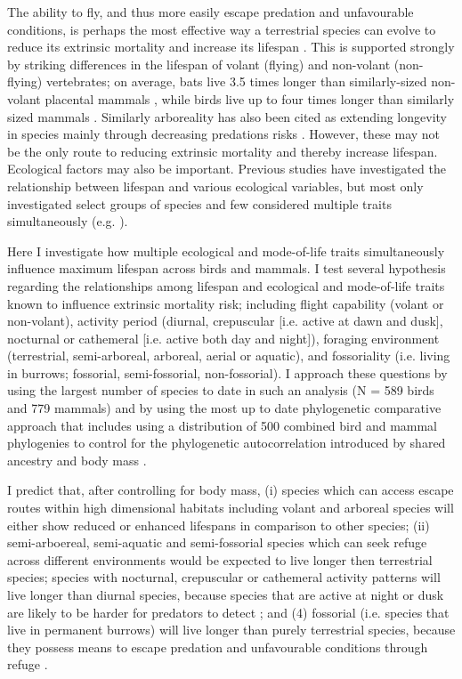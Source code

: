 The ability to fly, and thus more easily escape predation and unfavourable conditions, is perhaps the most effective way a terrestrial species can evolve to reduce its extrinsic mortality and increase its lifespan \citep{partridge1993optimality,holmes1994fly,pomeroy1990fly}. This is supported strongly by striking differences in the lifespan of volant (flying) and non-volant (non-flying) vertebrates; on average, bats live 3.5 times longer than similarly-sized non-volant placental mammals \citep{wilkinson2002life,austad1991mammalian}, while birds live up to four times longer than similarly sized mammals \citep{lindstedt1981body,holmes2003birds}. Similarly arboreality has also been cited as extending longevity in species mainly through decreasing predations risks \citep{shattuck2010arboreality}. However, these may not be the only route to reducing extrinsic mortality and thereby increase lifespan. Ecological factors may also be important. Previous studies have investigated the relationship between lifespan and various ecological variables, but most only investigated select groups of species and few considered multiple traits simultaneously (e.g. \cite{shattuck2010arboreality}).

Here I investigate how multiple ecological and mode-of-life traits simultaneously influence maximum lifespan across birds and mammals. I test several hypothesis regarding the relationships among lifespan and ecological and mode-of-life traits known to influence extrinsic mortality risk; including flight capability (volant or non-volant), activity period (diurnal, crepuscular [i.e. active at dawn and dusk], nocturnal or cathemeral [i.e. active both day and night]), foraging environment (terrestrial, semi-arboreal, arboreal, aerial or aquatic), and fossoriality (i.e. living in burrows; fossorial, semi-fossorial, non-fossorial). I approach these questions by using the largest number of species to date in such an analysis (N =  589 birds and 779 mammals) and by using the most up to date phylogenetic comparative approach that includes using a distribution of 500 combined bird and mammal phylogenies to control for the phylogenetic autocorrelation introduced by shared ancestry \citep{harvey1991comparative} and body mass \citep{lindstedt1981body}.


I predict that, after controlling for body mass, (i) species which can access escape routes within high dimensional habitats including volant and arboreal species will either show reduced or enhanced lifespans in comparison to other species; (ii) semi-arboereal, semi-aquatic and semi-fossorial species which can seek refuge across different environments would be expected to live longer then terrestrial species; species with nocturnal, crepuscular or cathemeral activity patterns will live longer than diurnal species, because species that are active at night or dusk are likely to be harder for predators to detect \citep{holmes1994fly,promislow1990living}; and (4) fossorial (i.e. species that live in permanent burrows) will live longer than purely terrestrial species, because they possess means to escape predation and unfavourable conditions through refuge \citep{buffenstein2002naked}.


